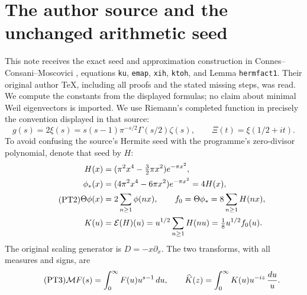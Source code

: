 \section{The author source and the unchanged arithmetic seed}
This note receives the exact seed and approximation construction in
Connes--Consani--Moscovici \cite{swtheta:CCM}, equations \texttt{ku},
\texttt{emap}, \texttt{xih}, \texttt{ktoh}, and Lemma
\texttt{hermfact1}. Their original author TeX, including all proofs
and the stated missing steps, was read. We compute the constants from
the displayed formulas; no claim about minimal Weil eigenvectors is
imported. We use Riemann's completed function in precisely the
convention displayed in that source:
\begin{equation}\tag{PT1}
 g(s)=2\xi(s)=s(s-1)\pi^{-s/2}\Gamma(s/2)\zeta(s),\qquad
 \Xi(t)=\xi(1/2+it).
\end{equation}
To avoid confusing the source's Hermite seed with the programme's
zero-divisor polynomial, denote that seed by $H$:
\begin{equation}\tag{PT2}
 \begin{split}
 H(x)&=(\pi^2x^4-\tfrac32\pi x^2)e^{-\pi x^2},\\
 \phi_*(x)&=(4\pi^2x^4-6\pi x^2)e^{-\pi x^2}=4H(x),\\
 \Theta\phi(x)&=2\sum_{n\geq1}\phi(nx),\qquad
 f_0=\Theta\phi_*=8\sum_{n\geq1}H(nx),\\
 K(u)&=\mathcal E(H)(u)=u^{1/2}\sum_{n\geq1}H(nu)
                   =\tfrac18u^{1/2}f_0(u).
 \end{split}
\end{equation}
The original scaling generator is $D=-x\partial_x$.
The two transforms, with all measures and signs, are
\begin{equation}\tag{PT3}
 \mathcal M F(s)=\int_0^\infty F(u)u^{s-1}\,du,\qquad
 \widehat K(z)=\int_0^\infty K(u)u^{-iz}\,\frac{du}{u}.
\end{equation}

